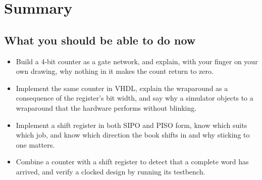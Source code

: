 
\section{Summary}
\label{c6:sec:review}

\subsection*{What you should be able to do now}
\begin{itemize}
  \item Build a 4-bit counter as a gate network, and explain, with your finger on your own drawing,
    why nothing in it makes the count return to zero.
  \item Implement the same counter in VHDL, explain the wraparound as a consequence of the
    register's bit width, and say why a simulator objects to a wraparound that the hardware performs
    without blinking.
  \item Implement a shift register in both SIPO and PISO form, know which suits which job, and know
    which direction the book shifts in and why sticking to one matters.
  \item Combine a counter with a shift register to detect that a complete word has arrived, and
    verify a clocked design by running its testbench.
\end{itemize}

